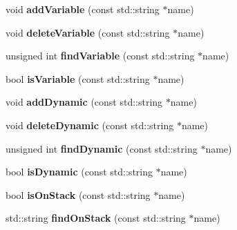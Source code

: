 \begin{DoxyCompactItemize}
\item 
\mbox{\label{class_context_add5876bef48e55fb6678b1fa66847c02}} 
void {\bfseries add\+Variable} (const std\+::string $\ast$name)
\item 
\mbox{\label{class_context_a1807ed5838267e41a8fd6a2f9746eb5d}} 
void {\bfseries delete\+Variable} (const std\+::string $\ast$name)
\item 
\mbox{\label{class_context_af0ca1f256d8e85df2776d98641645f6d}} 
unsigned int {\bfseries find\+Variable} (const std\+::string $\ast$name)
\item 
\mbox{\label{class_context_a3be2ed1410be651593ab477b452b6a74}} 
bool {\bfseries is\+Variable} (const std\+::string $\ast$name)
\item 
\mbox{\label{class_context_a01f91258841aeecffd6d89b243f75dc2}} 
void {\bfseries add\+Dynamic} (const std\+::string $\ast$name)
\item 
\mbox{\label{class_context_a9bb1b3c01ebbf9f5324f1b52f9c000c6}} 
void {\bfseries delete\+Dynamic} (const std\+::string $\ast$name)
\item 
\mbox{\label{class_context_abbdfcbf82bca5d5d4bb893323be65f39}} 
unsigned int {\bfseries find\+Dynamic} (const std\+::string $\ast$name)
\item 
\mbox{\label{class_context_ae7b29425bad6cdd9c653ab4d42835393}} 
bool {\bfseries is\+Dynamic} (const std\+::string $\ast$name)
\item 
\mbox{\label{class_context_a8dcc97f8f696b8f42bb554658decc369}} 
bool {\bfseries is\+On\+Stack} (const std\+::string $\ast$name)
\item 
\mbox{\label{class_context_a06f900b507c9013b789c945060bdb684}} 
std\+::string {\bfseries find\+On\+Stack} (const std\+::string $\ast$name)
\end{DoxyCompactItemize}
